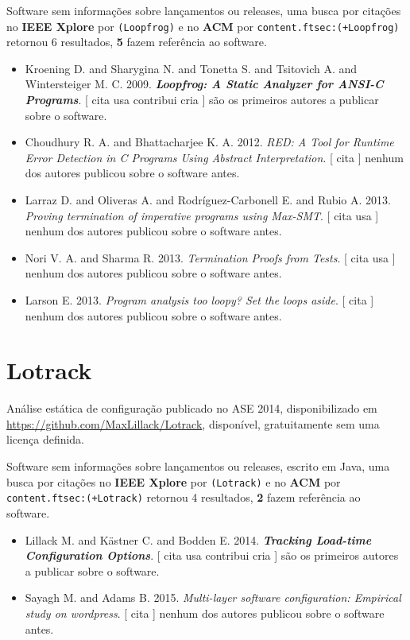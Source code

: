 Software sem informações sobre lançamentos ou releases,
uma busca por citações no {\bf IEEE Xplore} por
\texttt{(Loopfrog)}
e no {\bf ACM} por
\texttt{content.ftsec:(+Loopfrog)}
retornou
6 resultados,
{\bf 5} fazem referência ao software.

\begin{itemize}
\item Kroening D. and Sharygina N. and Tonetta S. and Tsitovich A. and Wintersteiger M. C.
      2009.
        \textbf{\textit{ Loopfrog: A Static Analyzer for ANSI-C Programs}}.
      [
          cita
          usa
          contribui
          cria
      ]
são os primeiros autores a publicar sobre o software.
\item Choudhury R. A. and Bhattacharjee K. A.
      2012.
        \textit{ RED: A Tool for Runtime Error Detection in C Programs Using Abstract Interpretation}.
      [
          cita
      ]
nenhum dos autores publicou sobre o software antes.
\item Larraz D. and Oliveras A. and Rodríguez-Carbonell E. and Rubio A.
      2013.
        \textit{ Proving termination of imperative programs using Max-SMT}.
      [
          cita
          usa
      ]
nenhum dos autores publicou sobre o software antes.
\item Nori V. A. and Sharma R.
      2013.
        \textit{ Termination Proofs from Tests}.
      [
          cita
          usa
      ]
nenhum dos autores publicou sobre o software antes.
\item Larson E.
      2013.
        \textit{ Program analysis too loopy? Set the loops aside}.
      [
          cita
      ]
nenhum dos autores publicou sobre o software antes.
\end{itemize}
\section{Lotrack}

Análise estática de configuração
publicado no ASE 2014,
disponibilizado em \url{https://github.com/MaxLillack/Lotrack},
disponível,
gratuitamente
sem uma licença definida.

Software sem informações sobre lançamentos ou releases,
escrito em Java,
uma busca por citações no {\bf IEEE Xplore} por
\texttt{(Lotrack)}
e no {\bf ACM} por
\texttt{content.ftsec:(+Lotrack)}
retornou
4 resultados,
{\bf 2} fazem referência ao software.

\begin{itemize}
\item Lillack M. and K\"{a}stner C. and Bodden E.
      2014.
        \textbf{\textit{ Tracking Load-time Configuration Options}}.
      [
          cita
          usa
          contribui
          cria
      ]
são os primeiros autores a publicar sobre o software.
\item Sayagh M. and Adams B.
      2015.
        \textit{ Multi-layer software configuration: Empirical study on wordpress}.
      [
          cita
      ]
nenhum dos autores publicou sobre o software antes.
\end{itemize}
